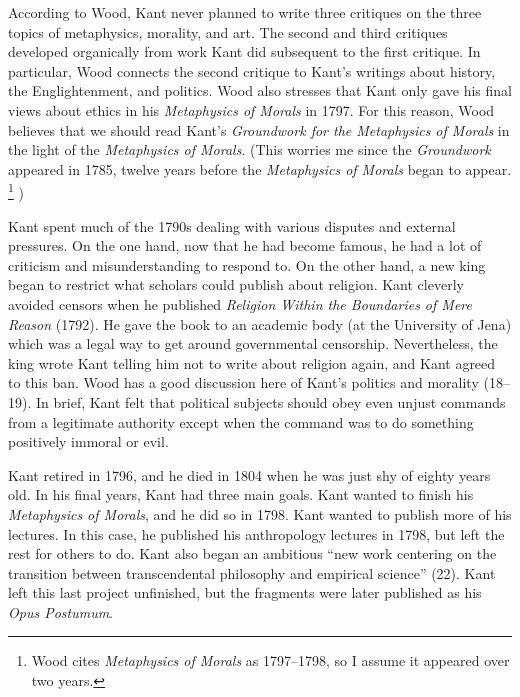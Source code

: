 \documentclass[12pt,letterpaper]{article}
\begin{document}
According to Wood, Kant never planned to write three critiques on the three topics of metaphysics, morality, and art.
The second and third critiques developed organically from work Kant did subsequent to the first critique.
In particular, Wood connects the second critique to Kant's writings about history, the Englightenment, and politics.
Wood also stresses that Kant only gave his final views about ethics in his \textit{Metaphysics of Morals} in 1797.
For this reason, Wood believes that we should read Kant's \textit{Groundwork for the Metaphysics of Morals} in the light of the \textit{Metaphysics of Morals}.
(This worries me since the \textit{Groundwork} appeared in 1785, twelve years before the \textit{Metaphysics of Morals} began to appear.%
\footnote{Wood cites \textit{Metaphysics of Morals} as 1797--1798, so I assume it appeared over two years.}%
)

Kant spent much of the 1790s dealing with various disputes and external pressures.
On the one hand, now that he had become famous, he had a lot of criticism and misunderstanding to respond to.
On the other hand, a new king began to restrict what scholars could publish about religion.
Kant cleverly avoided censors when he published \textit{Religion Within the Boundaries of Mere Reason} (1792).
He gave the book to an academic body (at the University of Jena) which was a legal way to get around governmental censorship.
Nevertheless, the king wrote Kant telling him not to write about religion again, and Kant agreed to this ban.
Wood has a good discussion here of Kant's politics and morality (18--19).
In brief, Kant felt that political subjects should obey even unjust commands from a legitimate authority except when the command was to do something positively immoral or evil.

Kant retired in 1796, and he died in 1804 when he was just shy of eighty years old.
In his final years, Kant had three main goals.
Kant wanted to finish his \textit{Metaphysics of Morals}, and he did so in 1798.
Kant wanted to publish more of his lectures.
In this case, he published his anthropology lectures in 1798, but left the rest for others to do.
Kant also began an ambitious ``new work centering on the transition between transcendental philosophy and empirical science'' (22).
Kant left this last project unfinished, but the fragments were later published as his \textit{Opus Postumum}.

\newpage
\pagestyle{references}

\printbibliography[filter=primary,title={Primary Sources}]
\printbibliography[filter=secondary,title={Secondary Sources}]
\end{document}
